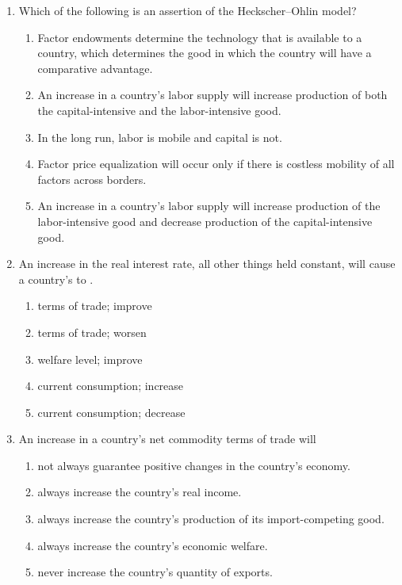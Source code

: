 \documentclass[12pt]{article}
\begin{document}
\begin{enumerate}[label=\textbf{\arabic*.}]
\item Which of the following is an assertion of the Heckscher--Ohlin model?
\begin{enumerate}[label=\Alph*.]
\item Factor endowments determine the technology that is available to a country, which determines the good in which the country will have a comparative advantage.
\item An increase in a country's labor supply will increase production of both the capital-intensive and the labor-intensive good.
\item In the long run, labor is mobile and capital is not.
\item Factor price equalization will occur only if there is costless mobility of all factors across borders.
\item An increase in a country's labor supply will increase production of the labor-intensive good and decrease production of the capital-intensive good.
\end{enumerate}

\item An increase in the real interest rate, all other things held constant, will cause a country's \underline{\hspace{2em}} to \underline{\hspace{2em}}.
\begin{enumerate}[label=\Alph*.]
\item terms of trade; improve
\item terms of trade; worsen
\item welfare level; improve
\item current consumption; increase
\item current consumption; decrease
\end{enumerate}

\item An increase in a country's net commodity terms of trade will
\begin{enumerate}[label=\Alph*.]
\item not always guarantee positive changes in the country's economy.
\item always increase the country's real income.
\item always increase the country's production of its import-competing good.
\item always increase the country's economic welfare.
\item never increase the country's quantity of exports.
\end{enumerate}


\end{enumerate}
\end{document}
